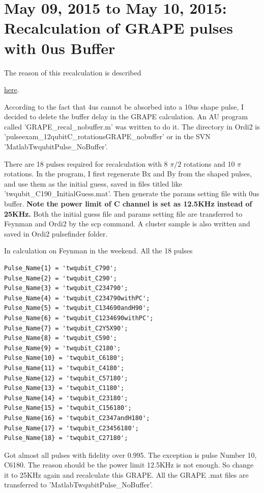 \clearpage
\section{May 09, 2015 to May 10, 2015: Recalculation of GRAPE pulses with 0us Buffer}

{}

\hypertarget{reason:pulse_no_buffer}{The reason of this recalculation is described}
\hyperlink{found:pulse_no_buffer}{here}.

According to the fact that 4us cannot be absorbed into a 10us shape pulse, I decided to delete the buffer delay in the GRAPE calculation. An AU program called 'GRAPE\_recal\_nobuffer.m' was written to do it. The directory in Ordi2 is '\dir pulseexam\_12qubit\dir C\_rotations\dir GRAPE\_nobuffer\dir' or in the SVN '\dir Matlab\dir Twqubit\dir Pulse\_NoBuffer\dir'.

There are 18 pulses required for recalculation with 8 $\pi/2$ rotations and 10 $\pi$ rotations. In the program, I first regenerate Bx and By from the shaped pulses, and use them as the initial guess, saved in files titled like 'twqubit\_C190\_InitialGuess.mat'. Then generate the params setting file with 0us buffer. \textbf{Note the power limit of C channel is set as 12.5KHz instead of 25KHz. }Both the initial guess file and params setting file are transferred to Feynman and Ordi2 by the scp command. A cluster sample is also written and saved in Ordi2 pulsefinder folder.

In calculation on Feynman in the weekend. All the 18 pulses
\begin{lstlisting}
Pulse_Name{1} = 'twqubit_C790';
Pulse_Name{2} = 'twqubit_C290';
Pulse_Name{3} = 'twqubit_C234790';
Pulse_Name{4} = 'twqubit_C234790withPC';
Pulse_Name{5} = 'twqubit_C134690andH90';
Pulse_Name{6} = 'twqubit_C1234690withPC';
Pulse_Name{7} = 'twqubit_C2Y5X90';
Pulse_Name{8} = 'twqubit_C590';
Pulse_Name{9} = 'twqubit_C2180';
Pulse_Name{10} = 'twqubit_C6180';
Pulse_Name{11} = 'twqubit_C4180';
Pulse_Name{12} = 'twqubit_C57180';
Pulse_Name{13} = 'twqubit_C1180';
Pulse_Name{14} = 'twqubit_C23180';
Pulse_Name{15} = 'twqubit_C156180';
Pulse_Name{16} = 'twqubit_C2347andH180';
Pulse_Name{17} = 'twqubit_C23456180';
Pulse_Name{18} = 'twqubit_C27180';
\end{lstlisting}

Got almost all pulses with fidelity over 0.995. The exception is pulse Number 10, C6180. The reason should be the power limit 12.5KHz is not enough. So change it to 25KHz again and recalculate this GRAPE. All the GRAPE .mat files are transferred to '\dir Matlab\dir Twqubit\dir Pulse\_NoBuffer\dir'.

